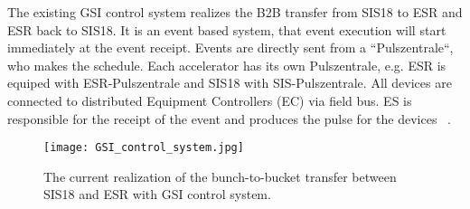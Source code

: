 The existing GSI control system realizes the B2B transfer from SIS18 to ESR and ESR back to SIS18. It is an event based system, that event execution will start immediately at the event receipt. Events are directly sent from a ``Pulszentrale``, who makes the schedule. Each accelerator has its own Pulszentrale, e.g. ESR is equiped with ESR-Pulszentrale and SIS18 with SIS-Pulszentrale. All devices are connected to distributed Equipment Controllers (EC) via field bus. ES is responsible for the receipt of the event and produces the pulse for the devices ~\cite{kainberger_pzs_2003, krause_re-engineering_2001}. 
\begin{figure}[H]
   \centering   
   \texttt{[image: GSI\_control\_system.jpg]}
   \caption{The current realization of the bunch-to-bucket transfer between SIS18 and ESR with GSI control system.}
   \label{GSI_control_system}
\end{figure}

